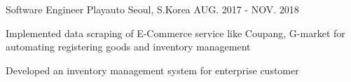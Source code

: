 \begin{cventries}
  \cventry
    {Software Engineer} %
    {Playauto} %
    {Seoul, S.Korea} %
    {AUG. 2017 - NOV. 2018} %
    {
      \begin{cvitems} %
        \item {Implemented data scraping of E-Commerce service like Coupang, G-market for automating registering goods and inventory management }
        \item {Developed an inventory management system for enterprise customer}
      \end{cvitems}
    }

\end{cventries}
